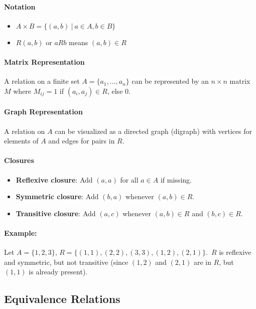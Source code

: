 \paragraph*{Notation}
\begin{itemize}
    \item $A \times B = \{(a, b)\ |\ a \in A, b \in B\}$
    \item $R(a, b)$ or $aRb$ means $(a, b) \in R$
\end{itemize}

\paragraph*{Matrix Representation}
A relation on a finite set $A = \{a_1, ..., a_n\}$ can be represented by an $n \times n$ matrix $M$ where $M_{ij} = 1$ if $(a_i, a_j) \in R$, else $0$.

\paragraph*{Graph Representation}
A relation on $A$ can be visualized as a directed graph (digraph) with vertices for elements of $A$ and edges for pairs in $R$.

\paragraph*{Closures}
\begin{itemize}
    \item \textbf{Reflexive closure}: Add $(a,a)$ for all $a \in A$ if missing.
    \item \textbf{Symmetric closure}: Add $(b,a)$ whenever $(a,b) \in R$.
    \item \textbf{Transitive closure}: Add $(a,c)$ whenever $(a,b) \in R$ and $(b,c) \in R$.
\end{itemize}

\paragraph*{Example:}
Let $A = \{1,2,3\}$, $R = \{(1,1), (2,2), (3,3), (1,2), (2,1)\}$.\
$R$ is reflexive and symmetric, but not transitive (since $(1,2)$ and $(2,1)$ are in $R$, but $(1,1)$ is already present).

\subsection{Equivalence Relations}
\hrulefill

